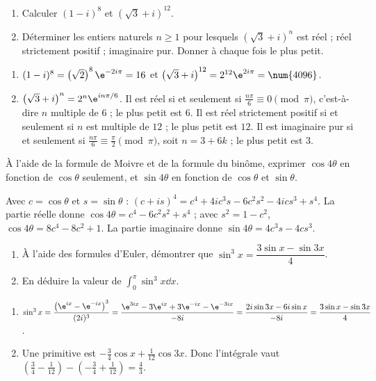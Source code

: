 \begin{exercise}[Puissances]
\begin{enumerate}
\item Calculer $(1-i)^8$ et $\left(\sqrt3+i\right)^{12}$.
\item Déterminer les entiers naturels $n\ge1$ pour lesquels $\left(\sqrt3+i\right)^n$ est réel ; réel strictement positif ; imaginaire pur. Donner à chaque fois le plus petit.
\end{enumerate}
\end{exercise}
\begin{solution}
\begin{enumerate}
\item $(1-i)^8=\left(\sqrt2\right)^8\e^{-2i\pi}=16$ et $\left(\sqrt3+i\right)^{12}=2^{12}\e^{2i\pi}=\num{4096}$.
\item $\left(\sqrt3+i\right)^n=2^n\e^{in\pi/6}$. Il est réel si et seulement si $\frac{n\pi}6\equiv0\pmod\pi$, c'est-à-dire $n$ multiple de $6$ ; le plus petit est $6$. Il est réel strictement positif si et seulement si $n$ est multiple de $12$ ; le plus petit est $12$. Il est imaginaire pur si et seulement si $\frac{n\pi}6\equiv\frac\pi2\pmod\pi$, soit $n=3+6k$ ; le plus petit est $3$.
\end{enumerate}
\end{solution}

\begin{exercise}
À l'aide de la formule de Moivre et de la formule du binôme, exprimer $\cos4\theta$ en fonction de $\cos\theta$ seulement, et $\sin4\theta$ en fonction de $\cos\theta$ et $\sin\theta$.
\end{exercise}
\begin{solution}
Avec $c=\cos\theta$ et $s=\sin\theta$ : $(c+is)^4=c^4+4ic^3s-6c^2s^2-4ics^3+s^4$. La partie réelle donne $\cos4\theta=c^4-6c^2s^2+s^4$ ; avec $s^2=1-c^2$, $\cos4\theta=8c^4-8c^2+1$. La partie imaginaire donne $\sin4\theta=4c^3s-4cs^3$.
\end{solution}

\begin{exercise}
\begin{enumerate}
\item À l'aide des formules d'Euler, démontrer que $\sin^3x=\dfrac{3\sin x-\sin3x}4$.
\item En déduire la valeur de $\displaystyle\int_0^\pi\sin^3x\dd x$.
\end{enumerate}
\end{exercise}
\begin{solution}
\begin{enumerate}
\item $\sin^3x=\dfrac{\left(\e^{ix}-\e^{-ix}\right)^3}{(2i)^3}=\dfrac{\e^{3ix}-3\e^{ix}+3\e^{-ix}-\e^{-3ix}}{-8i}=\dfrac{2i\sin3x-6i\sin x}{-8i}=\dfrac{3\sin x-\sin3x}4$.
\item Une primitive est $-\frac34\cos x+\frac1{12}\cos3x$. Donc l'intégrale vaut $\left(\frac34-\frac1{12}\right)-\left(-\frac34+\frac1{12}\right)=\frac43$.
\end{enumerate}
\end{solution}

